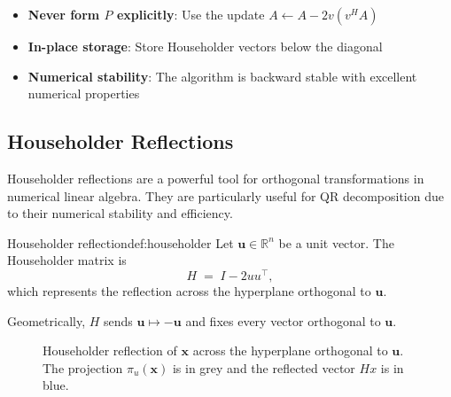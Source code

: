 \documentclass[../../main.tex]{subfiles}
\begin{document}
\begin{itemize}
    \item \textbf{Never form $P$ explicitly}: Use the update $A \leftarrow A - 2v(v^H A)$
    \item \textbf{In-place storage}: Store Householder vectors below the diagonal
    \item \textbf{Numerical stability}: The algorithm is backward stable with excellent numerical properties
\end{itemize}

\subsection{Householder Reflections}
Householder reflections are a powerful tool for orthogonal transformations in numerical linear algebra. They are particularly useful for QR decomposition due to their numerical stability and efficiency.

\begin{definition}{Householder reflection}{def:householder}
    Let $\mathbf{u} \in \mathbb{R}^n$ be a unit vector. The Householder matrix is
    \[
        H \;=\; I - 2uu^\top,
    \]
    which represents the reflection across the hyperplane orthogonal to $\mathbf{u}$.
\end{definition}

Geometrically, $H$ sends $\mathbf{u} \mapsto -\mathbf{u}$ and fixes every vector orthogonal to $\mathbf{u}$.

\begin{figure}[htb]
    \centering
    
    \caption{Householder reflection of $\mathbf{x}$ across the hyperplane orthogonal to $\mathbf{u}$. The projection $\pi_u(\mathbf{x})$ is in grey and the reflected vector $Hx$ is in blue.}
    \label{fig:householder-reflection}
\end{figure}
\end{document}
